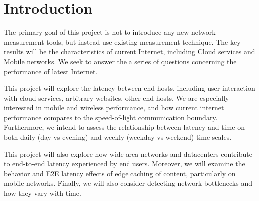 
\section{Introduction}
\label{sec:introduction}
The primary goal of this project is not to introduce any new network measurement tools, but instead use existing measurement technique. The key results will be the characteristics of current Internet, including Cloud services and Mobile networks. We seek to answer the a series of questions concerning the performance of latest Internet.

This project will explore the latency between end hosts, including user interaction with cloud services, arbitrary websites, other end hosts. We are especially interested in mobile and wireless performance, and how current internet performance compares to the speed-of-light communication boundary. Furthermore, we intend to assess the relationship between latency and time on both daily (day vs evening) and weekly (weekday vs weekend) time scales.

This project will also explore how wide-area networks and datacenters contribute to end-to-end latency experienced by end users. Moreover, we will examine the behavior and E2E latency effects of edge caching of content, particularly on mobile networks. Finally, we will also consider detecting network bottlenecks and how they vary with time.


